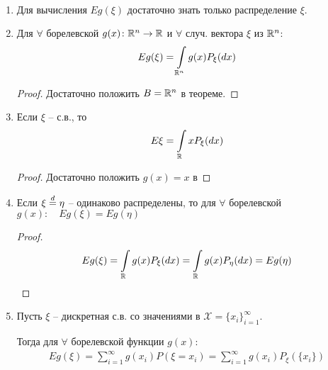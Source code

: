 \begin{corollary}~

  \begin{enumerate}[label=\protect\circled{\arabic*},series=lebesgue_corollary]
    \item
      Для вычисления $E g(\xi)$ достаточно знать только распределение $\xi$.

    \item
      Для $\forall$ борелевской $g(x)\colon \mathbb{R}^n \to \mathbb{R}$ и 
      $\forall$ случ. вектора $\xi$ из $\mathbb{R}^n$:
      \begin{align*}
        E g(\xi) = \int\limits_{\mathbb{R}^n} g(x) P_{\xi} (dx)
      \end{align*}

      \begin{proof}
        Достаточно положить $B = \mathbb{R}^n$ в теореме.
      \end{proof}

    \item
      Если $\xi$ -- с.в., то
      \begin{align*}
        E \xi = \int\limits_{\mathbb{R}} x P_{\xi} (dx)
      \end{align*}

      \begin{proof}
        Достаточно положить $g(x) = x$ в 
      \end{proof}

    \item
      Если $\xi \stackrel{d}{=} \eta$ -- одинаково распределены, 
      то для $\forall$ борелевской $g(x): \quad E g(\xi) = E g(\eta)$

      \begin{proof}
        \begin{align*}
          E g(\xi) = \int\limits_{\mathbb{R}} g(x) P_{\xi} (dx) = 
          \int\limits_{\mathbb{R}} g(x) P_{\eta} (dx) = E g(\eta)
        \end{align*}
      \end{proof}

    \item 
      Пусть $\xi$ -- дискретная с.в. со значениями в $\mathcal{X} = \{ x_i \}_{i = 1}^{\infty}$. 

      Тогда для $\forall$ борелевской функции $g(x):$
      \begin{align*}
        E g(\xi) = \sum_{i = 1}^{\infty} g(x_i) P(\xi = x_i) 
        = \sum_{i = 1}^{\infty} g(x_i) P_{\xi}(\{x_i\})
      \end{align*}


\end{enumerate}
\end{corollary}
